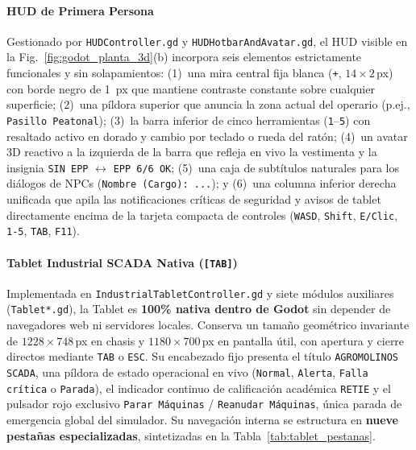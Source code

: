 \paragraph*{HUD de Primera Persona}
Gestionado por \texttt{HUD\allowbreak Controller.gd} y \texttt{HUDHotbar\allowbreak AndAvatar.gd}, el HUD visible en la Fig.~\ref{fig:godot_planta_3d}(b) incorpora seis elementos estrictamente funcionales y sin solapamientos: (1)~una mira central fija blanca (\texttt{+}, $14\times 2$\,px) con borde negro de \qty{1}{px} que mantiene contraste constante sobre cualquier superficie; (2)~una píldora superior que anuncia la zona actual del operario (p.ej., \texttt{Pasillo Peatonal}); (3)~la barra inferior de cinco herramientas (\texttt{1}--\texttt{5}) con resaltado activo en dorado y cambio por teclado o rueda del ratón; (4)~un avatar 3D reactivo a la izquierda de la barra que refleja en vivo la vestimenta y la insignia \texttt{SIN EPP} $\leftrightarrow$ \texttt{EPP 6/6 OK}; (5)~una caja de subtítulos naturales para los diálogos de NPCs (\texttt{Nombre (Cargo): ...}); y (6)~una columna inferior derecha unificada que apila las notificaciones críticas de seguridad y avisos de tablet directamente encima de la tarjeta compacta de controles (\texttt{WASD}, \texttt{Shift}, \texttt{E/Clic}, \texttt{1-5}, \texttt{TAB}, \texttt{F11}).

\paragraph*{Tablet Industrial SCADA Nativa (\texttt{[TAB]})}
Implementada en \texttt{Industrial\allowbreak Tablet\allowbreak Controller.gd} y siete módulos auxiliares (\texttt{Tablet*.gd}), la Tablet es \textbf{100\% nativa dentro de Godot} sin depender de navegadores web ni servidores locales. Conserva un tamaño geométrico invariante de $1228\times 748$\,px en chasis y $1180\times 700$\,px en pantalla útil, con apertura y cierre directos mediante \texttt{TAB} o \texttt{ESC}. Su encabezado fijo presenta el título \texttt{AGROMOLINOS SCADA}, una píldora de estado operacional en vivo (\texttt{Normal}, \texttt{Alerta}, \texttt{Falla crítica} o \texttt{Parada}), el indicador continuo de calificación académica \texttt{RETIE} y el pulsador rojo exclusivo \texttt{Parar Máquinas} / \texttt{Reanudar Máquinas}, única parada de emergencia global del simulador. Su navegación interna se estructura en \textbf{nueve pestañas especializadas}, sintetizadas en la Tabla~\ref{tab:tablet_pestanas}.

